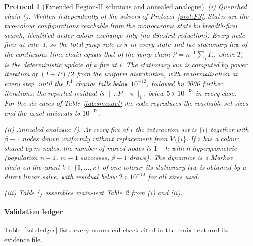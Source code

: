 \documentclass[pdflatex,sn-mathphys-num]{sn-jnl}
\theoremstyle{thmstyleone}%
\theoremstyle{thmstylethree}%
\newtheorem{protocol}[theorem]{Protocol}
\theoremstyle{thmstyletwo}%
\begin{document}
\begin{protocol}[Extended Region-II solutions and annealed analogue]
\label{prot:F6}
\emph{(i) Quenched chain} (). Written
independently of the solvers of Protocol~\ref{prot:F3}. States are the
two-colour configurations reachable from the monochrome state by
breadth-first search, identified under colour exchange only (no dihedral
reduction). Every node fires at rate~1, so the total jump rate is $n$ in
every state and the stationary law of the continuous-time chain equals
that of the jump chain $P=n^{-1}\sum_iT_i$, where $T_i$ is the
deterministic update of a fire at $i$. The stationary law is computed by
power iteration of $(I+P)/2$ from the uniform distribution, with
renormalisation at every step, until the $L^1$ change falls below
$10^{-12}$, followed by 3000 further iterations; the reported residual is
$\|\pi P-\pi\|_1$, below $5\times10^{-13}$ in every case. For the six cases of
Table~\ref{tab:smexact} the code reproduces the reachable-set sizes and
the exact rationals to $10^{-12}$.

\emph{(ii) Annealed analogue} (). At
every fire of $i$ the interaction set is $\{i\}$ together with $\beta-1$
nodes drawn uniformly without replacement from $V\setminus\{i\}$. If $i$
has a colour shared by $m$ nodes, the number of moved nodes is $1+h$ with
$h$ hypergeometric (population $n-1$, $m-1$ successes, $\beta-1$ draws).
The dynamics is a Markov chain on the count $k\in\{0,\dots,n\}$ of one
colour; its stationary law is obtained by a direct linear solve, with
residual below $2\times10^{-13}$ for all sizes used.

\emph{(iii) Table} () assembles main-text
Table~2 from (i) and (ii).
\end{protocol}

\paragraph{Validation ledger}
Table~\ref{tab:ledger} lists every numerical check cited in the main text
and its evidence file.
\end{document}
